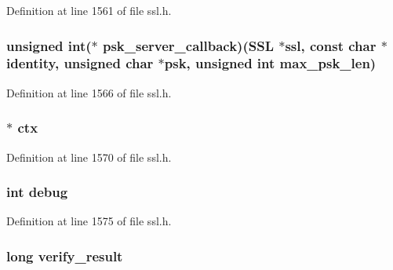 Definition at line 1561 of file ssl.\+h.

\subsubsection[{\texorpdfstring{psk\+\_\+server\+\_\+callback}{psk_server_callback}}]{\setlength{\rightskip}{0pt plus 5cm}unsigned int($\ast$ psk\+\_\+server\+\_\+callback)({\bf S\+SL} $\ast$ssl, const char $\ast$identity, unsigned char $\ast$psk, unsigned int max\+\_\+psk\+\_\+len)}\hypertarget{structssl__st_add4c613e3361a1ec0167149c336ea84d}{}\label{structssl__st_add4c613e3361a1ec0167149c336ea84d}


Definition at line 1566 of file ssl.\+h.

\subsubsection[{\texorpdfstring{ctx}{ctx}}]{ $\ast$ ctx}\hypertarget{structssl__st_a3c9a7f22a3c11e074d2a898fb813ebb4}{}\label{structssl__st_a3c9a7f22a3c11e074d2a898fb813ebb4}


Definition at line 1570 of file ssl.\+h.

\subsubsection[{\texorpdfstring{debug}{debug}}]{\setlength{\rightskip}{0pt plus 5cm}int debug}\hypertarget{structssl__st_ac3e1795766a80ec63b157951b4b9a7d4}{}\label{structssl__st_ac3e1795766a80ec63b157951b4b9a7d4}


Definition at line 1575 of file ssl.\+h.

\subsubsection[{\texorpdfstring{verify\+\_\+result}{verify_result}}]{\setlength{\rightskip}{0pt plus 5cm}long verify\+\_\+result}\hypertarget{structssl__st_a84b50be28bacc0340589457fc52d554a}{}\label{structssl__st_a84b50be28bacc0340589457fc52d554a}



